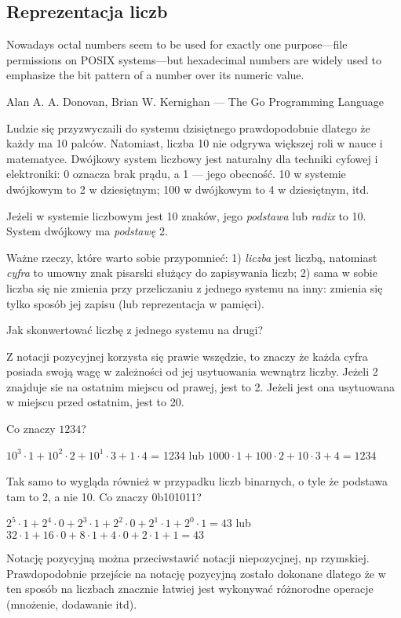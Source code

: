 \subsection{Reprezentacja liczb}

\epigraph{Nowadays octal numbers seem to be
used for exactly one purpose---file permissions on POSIX systems---but hexadecimal numbers
are widely used to emphasize the bit pattern of a number over its numeric value.}
{Alan A. A. Donovan, Brian W. Kernighan ---  The Go Programming Language}

Ludzie się przyzwyczaili do systemu dzisiętnego prawdopodobnie dlatego że każdy ma 10 palców.
Natomiast, liczba 10 nie odgrywa większej roli w nauce i matematyce.
Dwójkowy system liczbowy jest naturalny dla techniki cyfowej i elektroniki: 0 oznacza brak prądu, a 1 --- jego obecność.
10 w systemie dwójkowym to 2 w dziesiętnym; 100 w dwójkowym to 4 w dziesiętnym, itd.

Jeżeli w systemie liczbowym jest 10 znaków, jego \emph{podstawa} lub \emph{radix} to 10.
System dwójkowy ma \emph{podstawę} 2.

Ważne rzeczy, które warto sobie przypomnieć:
1) \emph{liczba} jest liczbą, natomiast \emph{cyfra} to umowny znak pisarski służący do zapisywania liczb;
2) sama w sobie liczba się nie zmienia przy przeliczaniu z jednego systemu na inny: zmienia się tylko sposób jej zapisu (lub reprezentacja w pamięci).

Jak skonwertować liczbę z jednego systemu na drugi?

Z notacji pozycyjnej korzysta się prawie wszędzie, to znaczy że każda cyfra posiada swoją wagę w zależności od jej usytuowania wewnątrz liczby.
Jeżeli 2 znajduje sie na ostatnim miejscu od prawej, jest to 2.
Jeżeli jest ona usytuowana w miejscu przed ostatnim, jest to 20.

Co znaczy $1234$?

$10^3 \cdot 1 + 10^2 \cdot 2 + 10^1 \cdot 3 + 1 \cdot 4$ = 1234 lub
$1000 \cdot 1 + 100 \cdot 2 + 10 \cdot 3 + 4 = 1234$

Tak samo to wygląda również w przypadku liczb binarnych, o tyle że podstawa tam to 2, a nie 10.
Co znaczy 0b101011?

$2^5 \cdot 1 + 2^4 \cdot 0 + 2^3 \cdot 1 + 2^2 \cdot 0 + 2^1 \cdot 1 + 2^0 \cdot 1 = 43$ lub
$32 \cdot 1 + 16 \cdot 0 + 8 \cdot 1 + 4 \cdot 0 + 2 \cdot 1 + 1 = 43$

Notację pozycyjną można przeciwstawić notacji niepozycjnej, np rzymskiej.
Prawdopodobnie przejście na notację pozycyjną zostało dokonane dlatego że w ten sposób na liczbach znacznie łatwiej jest wykonywać różnorodne operacje (mnożenie, dodawanie itd).

